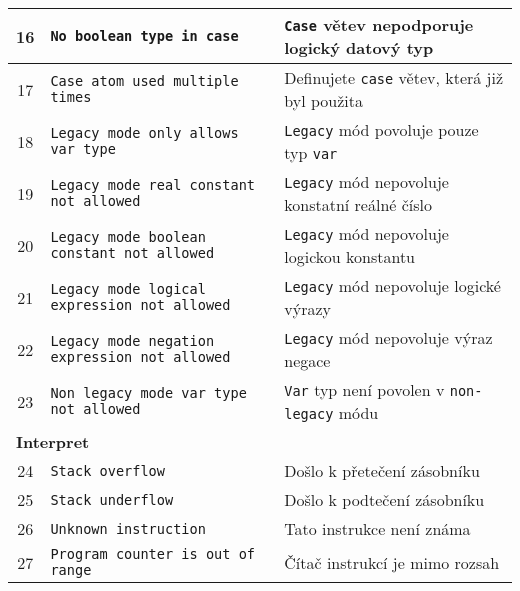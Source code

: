 \documentclass[
12pt,
a4paper,
pdftex,
czech
]{report}
\begin{document}
\begin{longtable}{|c|p{5.5cm}|p{6.5cm}|}
\rule{0pt}{3ex}16 & \texttt{No boolean type in case} & \texttt{Case} větev nepodporuje logický datový typ \\ \hline
\rule{0pt}{3ex}17 & \texttt{Case atom used multiple times} & Definujete \texttt{case} větev, která již byl použita \\ \hline
\rule{0pt}{3ex}18 & \texttt{Legacy mode only allows var type} & \texttt{Legacy} mód povoluje pouze typ \texttt{var} \\ \hline
\rule{0pt}{3ex}19 & \texttt{Legacy mode real constant not allowed} & \texttt{Legacy} mód nepovoluje konstatní reálné číslo \\ \hline
\rule{0pt}{3ex}20 & \texttt{Legacy mode boolean constant not allowed} & \texttt{Legacy} mód nepovoluje logickou konstantu \\ \hline
\rule{0pt}{3ex}21 & \texttt{Legacy mode logical expression not allowed} & \texttt{Legacy} mód nepovoluje logické výrazy \\ \hline
\rule{0pt}{3ex}22 & \texttt{Legacy mode negation expression not allowed} & \texttt{Legacy} mód nepovoluje výraz negace \\ \hline
\rule{0pt}{3ex}23 & \texttt{Non legacy mode var type not allowed} & \texttt{Var} typ není povolen v \texttt{non-legacy} módu \\ \hline
\multicolumn{3}{|l|}{\textbf{Interpret}}\\ \hline
\rule{0pt}{3ex}24 & \texttt{Stack overflow} & Došlo k přetečení zásobníku \\ \hline
\rule{0pt}{3ex}25 & \texttt{Stack underflow} & Došlo k podtečení zásobníku \\ \hline
\rule{0pt}{3ex}26 & \texttt{Unknown instruction} & Tato instrukce není známa \\ \hline
\rule{0pt}{3ex}27 & \texttt{Program counter is out of range} & Čítač instrukcí je mimo rozsah \\ \hline
\end{longtable}
\end{document}
